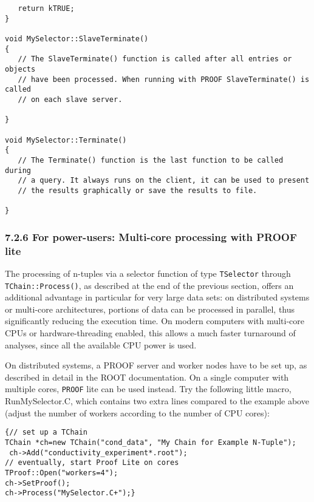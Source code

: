 \documentclass{article}
\begin{document}
\begin{verbatim}
   return kTRUE;
}

void MySelector::SlaveTerminate()
{
   // The SlaveTerminate() function is called after all entries or objects
   // have been processed. When running with PROOF SlaveTerminate() is called
   // on each slave server.

}

void MySelector::Terminate()
{
   // The Terminate() function is the last function to be called during
   // a query. It always runs on the client, it can be used to present
   // the results graphically or save the results to file.

}
\end{verbatim}

\subsubsection{7.2.6 For power-users: Multi-core processing with PROOF
lite}\label{for-power-users-multi-core-processing-with-proof-lite}

The processing of n-tuples via a selector function of type
\texttt{TSelector} through \texttt{TChain::Process()}, as described at
the end of the previous section, offers an additional advantage in
particular for very large data sets: on distributed systems or
multi-core architectures, portions of data can be processed in parallel,
thus significantly reducing the execution time. On modern computers with
multi-core CPUs or hardware-threading enabled, this allows a much faster
turnaround of analyses, since all the available CPU power is used.

On distributed systems, a PROOF server and worker nodes have to be set
up, as described in detail in the ROOT documentation. On a single
computer with multiple cores, \texttt{PROOF} lite can be used instead.
Try the following little macro, RunMySelector.C, which contains two
extra lines compared to the example above (adjust the number of workers
according to the number of CPU cores):

\begin{verbatim}
{// set up a TChain
TChain *ch=new TChain("cond_data", "My Chain for Example N-Tuple");
 ch->Add("conductivity_experiment*.root");
// eventually, start Proof Lite on cores
TProof::Open("workers=4");
ch->SetProof();
ch->Process("MySelector.C+");}
\end{verbatim}
\end{document}
